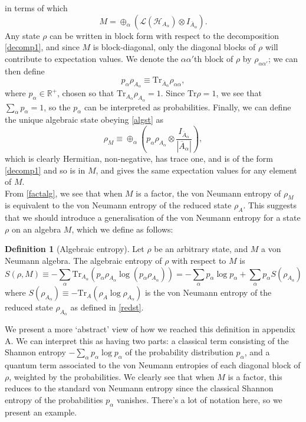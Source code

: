 \documentclass[12pt,a4paper]{report}
\numberwithin{equation}{section}
\newcommand{\ol}[1]{\overline{#1}}
\newcommand{\tr}{\text{Tr}}
\theoremstyle{definition}
\newtheorem{definition}{Definition}[section]
\theoremstyle{theorem}
\theoremstyle{theorem}
\theoremstyle{example}
\theoremstyle{definition}
\begin{document}
in terms of which 
\begin{equation}
	M=\oplus_{\alpha}(\mathcal{L}(\mathcal{H}_{A_{\alpha}})\otimes I_{\ol{A}_{\alpha}}).
\end{equation}
Any state $\rho$ can be written in block form with respect to the decomposition \ref{decomp1}, and since $M$ is block-diagonal, only the diagonal blocks of $\rho$ will contribute to expectation values. We denote the $\alpha\alpha'$th block of $\rho$ by $\rho_{\alpha\alpha'}$; we can then define
\begin{equation}\label{redst}
	p_{\alpha}\rho_{A_{\alpha}}\equiv\tr_{\ol{A}_{\alpha}}\rho_{\alpha\alpha},
\end{equation}
where $p_{\alpha}\in\mathbb{R}^{+}$, chosen so that $\tr_{A_{\alpha}}\rho_{A_{\alpha}}=1$. Since $\tr\rho=1$, we see that $\sum_{\alpha}p_{\alpha}=1$, so the $p_{\alpha}$ can be interpreted as probabilities. Finally, we can define the unique algebraic state obeying \ref{algst} as
\begin{equation}
	\rho_{M}\equiv\oplus_{\alpha}\left(p_{\alpha}\rho_{A_{\alpha}}\otimes\frac{I_{\ol{A}_{\alpha}}}{|\ol{A}_{\alpha}|}\right),
\end{equation}
which is clearly Hermitian, non-negative, has trace one, and is of the form \ref{decomp1} and so is in $M$, and gives the same expectation values for any element of $M$.\\
From \ref{factalg}, we see that when $M$ is a factor, the von Neumann entropy of $\rho_{M}$ is equivalent to the von Neumann entropy of the reduced state $\rho_{A}$. This suggests that we should introduce a generalisation of the von Neumann entropy for a state $\rho$ on an algebra $M$, which we define as follows:
\begin{definition}[Algebraic entropy]
	Let $\rho$ be an arbitrary state, and $M$ a von Neumann algebra. The algebraic entropy of $\rho$ with respect to $M$ is
	\begin{equation}
		S(\rho,M)\equiv-\sum_{\alpha}\tr_{A_{\alpha}}(p_{\alpha}\rho_{A_{\alpha}}\log(p_{\alpha}\rho_{A_{\alpha}}))=-\sum_{\alpha}p_{\alpha}\log p_{\alpha}+\sum_{\alpha}p_{\alpha}S(\rho_{A_{\alpha}})
	\end{equation}
	where $S(\rho_{A_{\alpha}})\equiv-\tr_{A}(\rho_{A}\log\rho_{A_{\alpha}})$ is the von Neumann entropy of the reduced state $\rho_{A_{\alpha}}$ as defined in \ref{redst}.
\end{definition}
We present a more `abstract' view of how we reached this definition in appendix A. We can interpret this as having two parts: a classical term consisting of the Shannon entropy $-\sum_{\alpha}p_{\alpha}\log{p_{\alpha}}$ of the probability distribution $p_{\alpha}$, and a quantum term associated to the von Neumann entropies of each diagonal block of $\rho$, weighted by the probabilities. We clearly see that when $M$ is a factor, this reduces to the standard von Neumann entropy since the classical Shannon entropy of the probabilities $p_{\alpha}$ vanishes. There's a lot of notation here, so we present an example.
\end{document}
